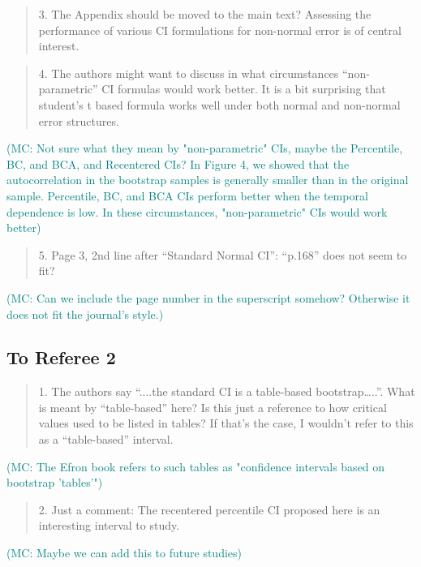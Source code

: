 \documentclass[12pt]{article}
\newcommand{\mc}[1]{\textcolor{teal}{(MC: #1)}}
\newenvironment{comment}%
{\begin{quotation}\noindent\small\it\color{darkblue}\ignorespaces%
}{\end{quotation}}
\begin{document}
\begin{comment}
3. The Appendix should be moved to the main text? Assessing the performance of 
various CI formulations for non-normal error is of central interest.
\end{comment} 



\begin{comment}
4. The authors might want to discuss in what circumstances “non-parametric” CI 
formulas would work better. It is a bit surprising that student’s t based 
formula works well under both normal and non-normal error structures.
\end{comment}

\mc{Not sure what they mean by "non-parametric" CIs, maybe the Percentile, BC,
and BCA, and Recentered CIs? In Figure 4, we showed that the autocorrelation in
the bootstrap samples is generally smaller than in the original sample. 
Percentile, BC, and BCA CIs perform better when the temporal dependence is low.
In these circumstances, "non-parametric" CIs would work better}

\begin{comment}
5. Page 3, 2nd line after “Standard Normal CI”: “p.168” does not seem to fit?
\end{comment}

\mc{Can we include the page number in the superscript somehow? Otherwise it does
not fit the journal's style.}

\subsection*{To Referee 2}

\begin{comment}
1. The authors say “....the standard CI is a table-based bootstrap…..”.  
What is meant by “table-based” here?  Is this just a reference to how critical 
values used to be listed in tables?  If that’s the case, I wouldn’t refer to 
this as a “table-based” interval. 
\end{comment}

\mc{The Efron book refers to such tables as "confidence intervals based on 
bootstrap 'tables'"}


\begin{comment}
2. Just a comment: The recentered percentile CI proposed here is an interesting 
interval to study. 
\end{comment}

\mc{Maybe we can add this to future studies}
\end{document}
